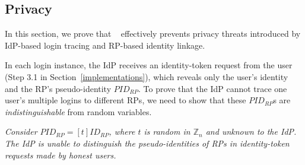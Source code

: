 {%

\subsection{Privacy}
\label{sec-:analysis}
In this section, we prove that \usso~ effectively prevents privacy threats introduced by IdP-based login tracing and RP-based identity linkage.

\newc In each login instance, the IdP receives an identity-token request from the user (Step 3.1 in Section~\ref{implementations}), which reveals only the user's identity and the RP's pseudo-identity $PID_{RP}$. To prove that the IdP cannot trace one user's multiple logins to different RPs, we need to show that these $PID_{RP}$s are \emph{indistinguishable} from random variables.

\vspace{1mm}
 {\em Consider $PID_{RP} = [t]ID_{RP}$, where $t$ is random in $\mathbb{Z}_n$ and unknown to the IdP. The IdP is unable to distinguish the pseudo-identities of RPs in identity-token requests made by honest users.}

\vspace{0.75mm}
}
